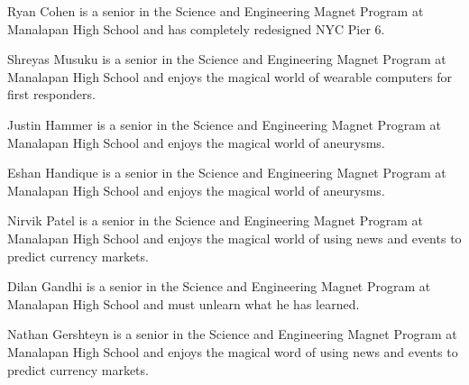 \documentclass[10pt,journal,twoside]{IEEEtran}
\begin{document}
\nocite{tipler}


\vspace{0.6in}
\begin{IEEEbiography}{Ryan Cohen} is a senior in the Science and Engineering Magnet Program at Manalapan High School and has completely redesigned NYC Pier 6. 
\end{IEEEbiography}
\begin{IEEEbiography}{Shreyas Musuku} is a senior in the Science and Engineering Magnet Program at Manalapan High School and enjoys the magical world of wearable computers for first responders. 
\end{IEEEbiography}
\begin{IEEEbiography}{Justin Hammer} is a senior in the Science and Engineering Magnet Program at Manalapan High School and enjoys the magical world of aneurysms. 
\end{IEEEbiography}
\vfill
\newpage
\begin{IEEEbiography}{Eshan Handique} is a senior in the Science and Engineering Magnet Program at Manalapan High School and enjoys the magical world of aneurysms. 
\end{IEEEbiography}
\begin{IEEEbiography}{Nirvik Patel} is a senior in the Science and Engineering Magnet Program at Manalapan High School and enjoys the magical world of using news and events to predict currency markets. 
\end{IEEEbiography}
\begin{IEEEbiography}{Dilan Gandhi} is a senior in the Science and Engineering Magnet Program at Manalapan High School and must unlearn what he has learned. 
\end{IEEEbiography}
\begin{IEEEbiography}{Nathan Gershteyn} is a senior in the Science and Engineering Magnet Program at Manalapan High School and enjoys the magical word of using news and events to predict currency markets. 
\end{IEEEbiography}
\vfill
\end{document}
